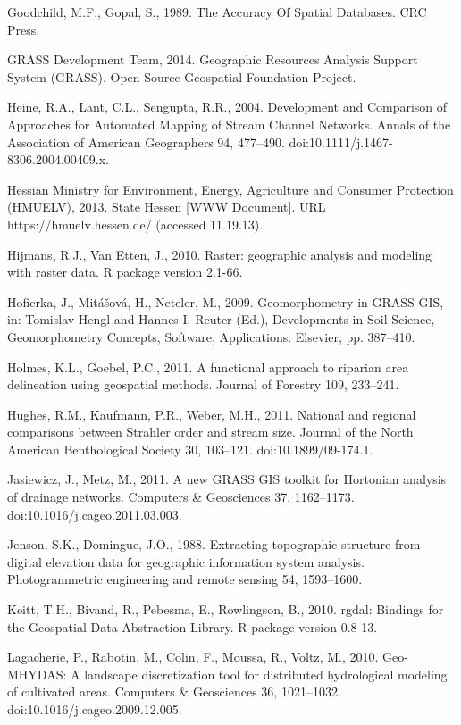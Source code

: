 \begin{thebibliography}
\bibitem{} \hangindent=1cm Goodchild, M.F., Gopal, S., 1989. The Accuracy Of Spatial Databases. CRC Press.

\bibitem{} \hangindent=1cm GRASS Development Team, 2014. Geographic Resources Analysis Support System (GRASS). Open Source Geospatial Foundation Project.

\bibitem{} \hangindent=1cm Heine, R.A., Lant, C.L., Sengupta, R.R., 2004. Development and Comparison of Approaches for Automated Mapping of Stream Channel Networks. Annals of the Association of American Geographers 94, 477–490. doi:10.1111/j.1467-8306.2004.00409.x.

\bibitem{} \hangindent=1cm Hessian Ministry for Environment, Energy, Agriculture and Consumer Protection (HMUELV), 2013. State Hessen [WWW Document]. URL https://hmuelv.hessen.de/ (accessed 11.19.13).

\bibitem{} \hangindent=1cm Hijmans, R.J., Van Etten, J., 2010. Raster: geographic analysis and modeling with raster data. R package version 2.1-66.

\bibitem{} \hangindent=1cm Hofierka, J., Mitášová, H., Neteler, M., 2009. Geomorphometry in GRASS GIS, in: Tomislav Hengl and Hannes I. Reuter (Ed.), Developments in Soil Science, Geomorphometry Concepts, Software, Applications. Elsevier, pp. 387–410.

\bibitem{} \hangindent=1cm Holmes, K.L., Goebel, P.C., 2011. A functional approach to riparian area delineation using geospatial methods. Journal of Forestry 109, 233–241.

\bibitem{} \hangindent=1cm Hughes, R.M., Kaufmann, P.R., Weber, M.H., 2011. National and regional comparisons between Strahler order and stream size. Journal of the North American Benthological Society 30, 103–121. doi:10.1899/09-174.1.

\bibitem{} \hangindent=1cm Jasiewicz, J., Metz, M., 2011. A new GRASS GIS toolkit for Hortonian analysis of drainage networks. Computers & Geosciences 37, 1162–1173. doi:10.1016/j.cageo.2011.03.003. 

\bibitem{} \hangindent=1cm Jenson, S.K., Domingue, J.O., 1988. Extracting topographic structure from digital elevation data for geographic information system analysis. Photogrammetric engineering and remote sensing 54, 1593–1600.

\bibitem{} \hangindent=1cm Keitt, T.H., Bivand, R., Pebesma, E., Rowlingson, B., 2010. rgdal: Bindings for the Geospatial Data Abstraction Library. R package version 0.8-13.

\bibitem{} \hangindent=1cm Lagacherie, P., Rabotin, M., Colin, F., Moussa, R., Voltz, M., 2010. Geo-MHYDAS: A landscape discretization tool for distributed hydrological modeling of cultivated areas. Computers & Geosciences 36, 1021–1032. doi:10.1016/j.cageo.2009.12.005.


\end{thebibliography}
